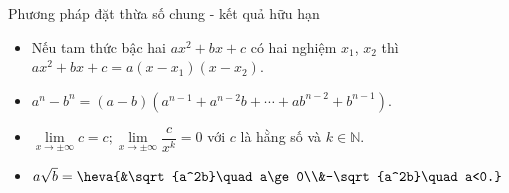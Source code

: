 \begin{dang}{Phương pháp đặt thừa số chung - kết quả hữu hạn}
		\begin{itemize}
		\item Nếu tam thức bậc hai $ax^2+bx+c$ có hai nghiệm $x_1$, $x_2$ thì $ ax^2+bx+c=a(x-x_1)(x-x_2)$.
		\item $a^n-b^n=(a-b)\left(a^{n-1}+a^{n-2}b+\cdots +ab^{n-2}+b^{n-1}\right)$.
		\item $\lim\limits_{x\to \pm \infty } c=c;\lim\limits_{x\to \pm \infty } \dfrac {c}{x^k}=0$ với $c$ là hằng số và $ k\in \mathbb{N}$.
		\item $a\sqrt{b}=\heva{&\sqrt{a^2b}\quad a\ge 0\\&-\sqrt{a^2b}\quad a<0.}$
		\end{itemize}
\end{dang}
